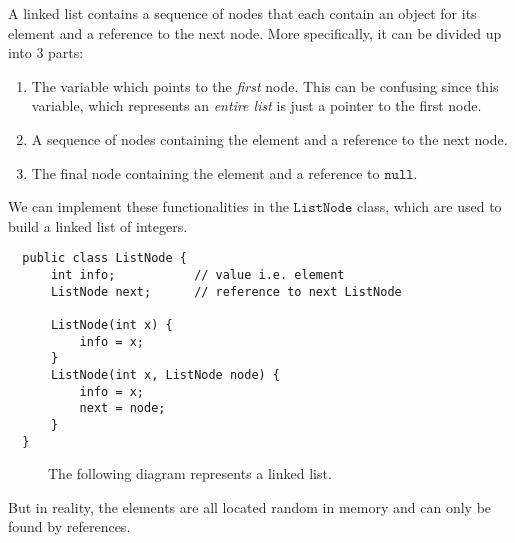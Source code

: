   \begin{definition}
  A linked list contains a sequence of nodes that each contain an object for its element and a reference to the next node. More specifically, it can be divided up into 3 parts: 
  \begin{enumerate}
      \item The variable which points to the \textit{first} node. This can be confusing since this variable, which represents an \textit{entire list} is just a pointer to the first node. 
      \item A sequence of nodes containing the element and a reference to the next node. 
      \item The final node containing the element and a reference to $\texttt{null}$. 
  \end{enumerate}
  We can implement these functionalities in the $\texttt{ListNode}$ class, which are used to build a linked list of integers. 
  \begin{lstlisting}
  public class ListNode {
      int info;           // value i.e. element 
      ListNode next;      // reference to next ListNode
      
      ListNode(int x) {
          info = x; 
      }
      ListNode(int x, ListNode node) {
          info = x; 
          next = node; 
      }
  }
  \end{lstlisting}

  \begin{figure}[H]
    \centering 
    \caption{The following diagram represents a linked list. } 
    \label{fig:linked_list}
  \end{figure}

  But in reality, the elements are all located random in memory and can only be found by references. 
  \end{definition}

